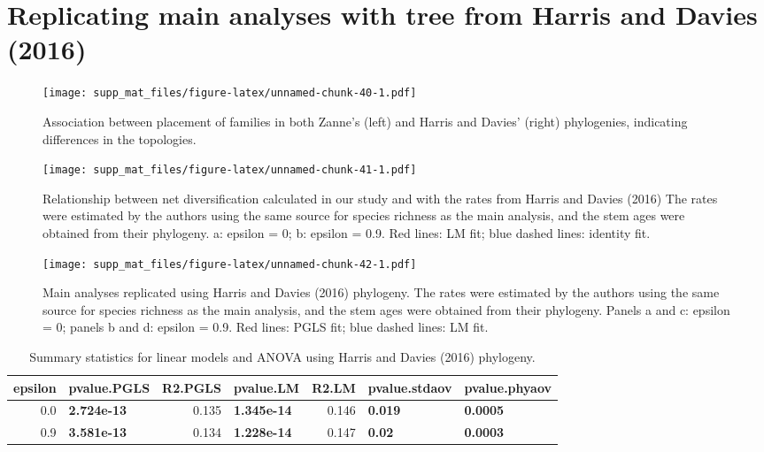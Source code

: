 \documentclass[]{article}
\begin{document}
\hypertarget{replicating-main-analyses-with-tree-from-harris-and-davies-2016}{%
\section{Replicating main analyses with tree from Harris and Davies
(2016)}\label{replicating-main-analyses-with-tree-from-harris-and-davies-2016}}

\begin{figure}
\centering
\texttt{[image: supp\_mat\_files/figure-latex/unnamed-chunk-40-1.pdf]}
\caption{Association between placement of families in both Zanne's
(left) and Harris and Davies' (right) phylogenies, indicating
differences in the topologies.}
\end{figure}

\begin{figure}
\centering
\texttt{[image: supp\_mat\_files/figure-latex/unnamed-chunk-41-1.pdf]}
\caption{Relationship between net diversification calculated in our
study and with the rates from Harris and Davies (2016) The rates were
estimated by the authors using the same source for species richness as
the main analysis, and the stem ages were obtained from their phylogeny.
a: epsilon = 0; b: epsilon = 0.9. Red lines: LM fit; blue dashed lines:
identity fit.}
\end{figure}

\begin{figure}
\centering
\texttt{[image: supp\_mat\_files/figure-latex/unnamed-chunk-42-1.pdf]}
\caption{Main analyses replicated using Harris and Davies (2016)
phylogeny. The rates were estimated by the authors using the same source
for species richness as the main analysis, and the stem ages were
obtained from their phylogeny. Panels a and c: epsilon = 0; panels b and
d: epsilon = 0.9. Red lines: PGLS fit; blue dashed lines: LM fit.}
\end{figure}

\begin{table}[H]

\caption{\label{tab:unnamed-chunk-43}Summary statistics for linear models and ANOVA using Harris and Davies (2016) phylogeny.}
\centering
\begin{tabular}{r|l|r|l|r|l|l}
\hline
epsilon & pvalue.PGLS & R2.PGLS & pvalue.LM & R2.LM & pvalue.stdaov & pvalue.phyaov\\
\hline
0.0 & \textbf{2.724e-13} & 0.135 & \textbf{1.345e-14} & 0.146 & \textbf{0.019} & \textbf{0.0005}\\
\hline
0.9 & \textbf{3.581e-13} & 0.134 & \textbf{1.228e-14} & 0.147 & \textbf{0.02} & \textbf{0.0003}\\
\hline
\end{tabular}
\end{table}
\end{document}
